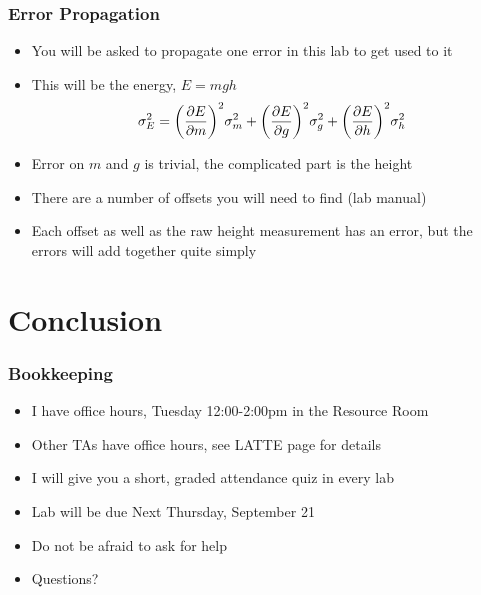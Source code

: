 \documentclass[aspectratio=169]{beamer}
\begin{document}
\begin{frame}
  \frametitle{Error Propagation}
  \begin{itemize}
  \item You will be asked to propagate one error in this lab to get used to it
  \item This will be the energy, $E=mgh$
    \begin{align*}
      \sigma_E^2=\qty(\pdv{E}{m})^2\sigma_m^2+
      \qty(\pdv{E}{g})^2\sigma_g^2+
      \qty(\pdv{E}{h})^2\sigma_h^2
    \end{align*}
  \item Error on $m$ and $g$ is trivial, the complicated part is the height
  \item There are a number of offsets you will need to find (lab manual)
  \item Each offset as well as the raw height measurement has an error, but the errors will add together quite simply
  \end{itemize}
\end{frame}

\section{Conclusion}
\begin{frame}
  \frametitle{Bookkeeping}
  \begin{itemize}
  \item I have office hours, Tuesday 12:00-2:00pm in the Resource Room
  \item Other TAs have office hours, see LATTE page for details
  \item I will give you a short, graded attendance quiz in every lab
  \item Lab will be due Next Thursday, September 21
  \item Do not be afraid to ask for help
  \item Questions?
  \end{itemize}
\end{frame}
\end{document}
